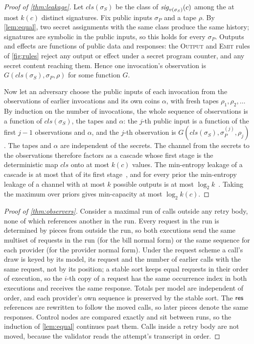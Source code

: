 \begin{proof}[Proof of \cref{thm:leakage}]
Let $\mathit{cls}(\sigma_S)$ be the class of $\mathit{sig}_{v(\sigma_S)}(c)$ among the at most $k(c)$
distinct signatures. Fix public inputs $\sigma_P$ and a tape $\rho$. By \cref{lem:equal},
two secret assignments with the same class produce the same history; signatures are
symbolic in the public inputs, so this holds for every $\sigma_P$. Outputs and effects
are functions of public data and responses: the \textsc{Output} and \textsc{Emit} rules
of \cref{fig:rules} reject any output or effect under a secret program counter, and any
secret content reaching them. Hence one invocation's observation is
$G(\mathit{cls}(\sigma_S), \sigma_P, \rho)$ for some function $G$.

Now let an adversary choose the public inputs of each invocation from the observations
of earlier invocations and its own coins $\alpha$, with fresh tapes $\rho_1, \rho_2,
\dots$ By induction on the number of invocations, the whole sequence of observations is
a function of $\mathit{cls}(\sigma_S)$, the tapes and $\alpha$: the $j$-th public input is
a function of the first $j-1$ observations and $\alpha$, and the $j$-th observation is
$G(\mathit{cls}(\sigma_S), \sigma_P^{(j)}, \rho_j)$. The tapes and $\alpha$ are independent
of the secrets. The channel from the secrets to the observations therefore factors as a
cascade whose first stage is the deterministic map $\mathit{cls}$ onto at most $k(c)$
values. The min-entropy leakage of a cascade is at most that of its first
stage~\cite{espinoza2012min}, and for every prior the min-entropy leakage of a channel
with at most $k$ possible outputs is at most $\log_2 k$~\cite[Theorem
1]{doychev2013cacheaudit}. Taking the maximum over priors gives min-capacity at most
$\log_2 k(c)$.
\end{proof}

\begin{proof}[Proof of \cref{thm:observers}]
Consider a maximal run of calls outside any retry body, none of which references
another in the run. Every request in the run is determined by pieces from outside the
run, so both executions send the same multiset of requests in the run (for the bill
normal form) or the same sequence for each provider (for the provider normal form).
Under the request scheme a call's draw is keyed by its model, its request and the
number of earlier calls with the same request, not by its position; a stable sort keeps
equal requests in their order of execution, so the $i$-th copy of a request has the same
occurrence index in both executions and receives the same response. Totals per model
are independent of order, and each provider's own sequence is preserved by the stable
sort. The $\mathsf{res}$ references are rewritten to follow the moved calls, so later pieces
denote the same responses. Control nodes are compared exactly and sit between runs, so
the induction of \cref{lem:equal} continues past them. Calls inside a retry body are not
moved, because the validator reads the attempt's transcript in order.
\end{proof}

